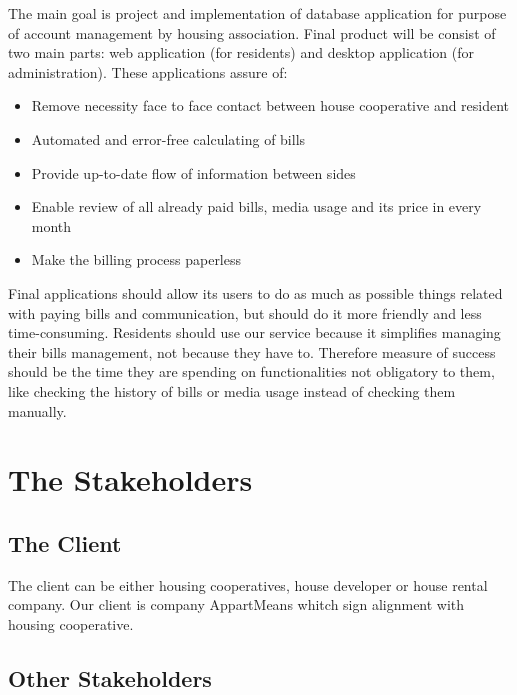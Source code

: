 \documentclass[a4paper,11pt,onecolumn,oneside]{book}
\begin{document}
The main goal is project and implementation of database application for purpose of account
management by housing association. Final product will be consist of two main parts: web
application (for residents) and desktop application (for administration). These applications
assure of:


\begin{itemize}
 
  \item Remove necessity face to face contact between house cooperative and resident
  \item  Automated and error-free calculating of bills
  \item Provide up-to-date flow of information between sides
  \item Enable review of all already paid bills, media usage and its price in every month
  \item Make the billing process paperless

\end{itemize}

Final applications should allow its users to do as much as possible things related with paying bills and communication, but should do it more friendly and less time-consuming. Residents should use our service because it simplifies managing their bills management, not because they have to. Therefore measure of success should be the time they are spending on functionalities not obligatory to them, like checking the history of bills or media usage instead of checking them manually.

\section{The Stakeholders}

\subsection{The Client}
The client can be either housing cooperatives,  house developer or house rental company. Our client is company AppartMeans whitch sign alignment with housing cooperative.

\subsection{Other Stakeholders}
\end{document}

